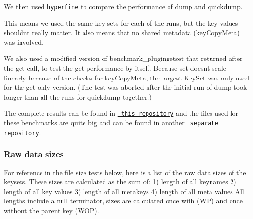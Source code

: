 We then used \href{https://github.com/sharkdp/hyperfine}{\texttt{ {\ttfamily hyperfine}}} to compare the performance of {\ttfamily dump} and {\ttfamily quickdump}.


\begin{DoxyCode}{0}
\end{DoxyCode}


This means we used the same key sets for each of the runs, but the key values shouldn\textquotesingle{}t really matter. It also means that no shared metadata ({\ttfamily key\+Copy\+Meta}) was involved.

We also used a modified version of {\ttfamily benchmark\+\_\+plugingetset} that returned after the {\ttfamily get} call, to test the {\ttfamily get} performance by itself. Because {\ttfamily set} doesn\textquotesingle{}t scale linearly because of the checks for {\ttfamily key\+Copy\+Meta}, the largest Key\+Set was only used for the {\ttfamily get} only version. (The test was aborted after the initial run of {\ttfamily dump} took longer than all the runs for {\ttfamily quickdump} together.)

The complete results can be found in \href{https://github.com/ElektraInitiative/rawdata}{\texttt{ this repository}} and the files used for these benchmarks are quite big and can be found in another \href{https://github.com/kodebach/eqd-bench}{\texttt{ separate repository}}.\hypertarget{autotoc_md545_autotoc_md548}{}\subsubsection{Raw data sizes}\label{autotoc_md545_autotoc_md548}
For reference in the file size tests below, here is a list of the raw data sizes of the keysets. These sizes are calculated as the sum of\+: 1) length of all keynames 2) length of all key values 3) length of all metakeys 4) length of all meta values All lengths include a null terminator, sizes are calculated once with (WP) and once without the parent key (W\+OP).

